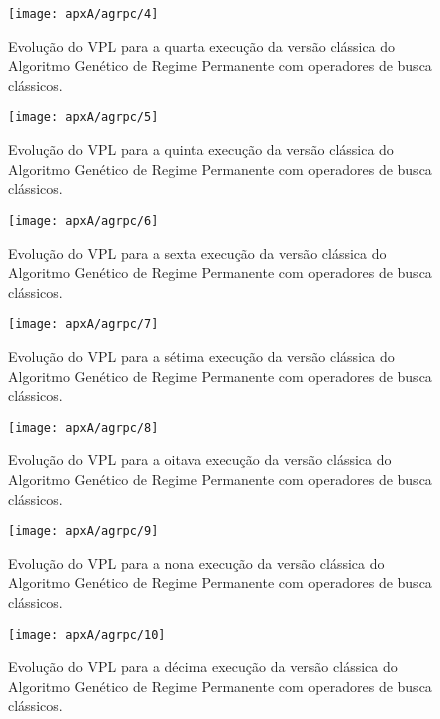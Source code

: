 \begin{figure}[H]
\centering
\texttt{[image: apxA/agrpc/4]}
\caption{Evolução do VPL para a quarta execução da versão clássica do Algoritmo Genético de Regime Permanente com operadores de busca clássicos.}
\label{fig:graphGRP1-04}
\end{figure}

\begin{figure}[H]
\centering
\texttt{[image: apxA/agrpc/5]}
\caption{Evolução do VPL para a quinta execução da versão clássica do Algoritmo Genético de Regime Permanente com operadores de busca clássicos.}
\label{fig:graphGRP1-05}
\end{figure}

\begin{figure}[H]
\centering
\texttt{[image: apxA/agrpc/6]}
\caption{Evolução do VPL para a sexta execução da versão clássica do Algoritmo Genético de Regime Permanente com operadores de busca clássicos.}
\label{fig:graphGRP1-06}
\end{figure}

\begin{figure}[H]
\centering
\texttt{[image: apxA/agrpc/7]}
\caption{Evolução do VPL para a sétima execução da versão clássica do Algoritmo Genético de Regime Permanente com operadores de busca clássicos.}
\label{fig:graphGRP1-07}
\end{figure}

\begin{figure}[H]
\centering
\texttt{[image: apxA/agrpc/8]}
\caption{Evolução do VPL para a oitava execução da versão clássica do Algoritmo Genético de Regime Permanente com operadores de busca clássicos.}
\label{fig:graphGRP1-08}
\end{figure}

\begin{figure}[H]
\centering
\texttt{[image: apxA/agrpc/9]}
\caption{Evolução do VPL para a nona execução da versão clássica do Algoritmo Genético de Regime Permanente com operadores de busca clássicos.}
\label{fig:graphGRP1-09}
\end{figure}

\begin{figure}[H]
\centering
\texttt{[image: apxA/agrpc/10]}
\caption{Evolução do VPL para a décima execução da versão clássica do Algoritmo Genético de Regime Permanente com operadores de busca clássicos.}
\label{fig:graphGRP1-10}
\end{figure}